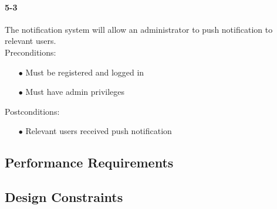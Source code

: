 \documentclass[a4paper,12pt]{article}
\begin{document}
\paragraph{5-3}
The notification system will allow an administrator to push notification to relevant users.\\
Preconditions:
\begin{itemize}
	\item[$\bullet$] Must be registered and logged in
	\item[$\bullet$] Must have admin privileges
\end{itemize}
Postconditions:
\begin{itemize}
	\item[$\bullet$] Relevant users received push notification
\end{itemize}
\subsection{Performance Requirements}
\subsection{Design Constraints}
\end{document}
